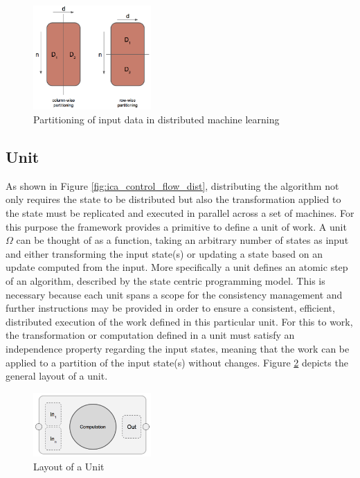 \begin{figure}[ht]
\centering
\includegraphics[width=0.4\textwidth]{img/row_col_dist.png}
\caption{Partitioning of input data in distributed machine learning}
\label{fig:row_col_dist}
\end{figure}

\subsection{Unit}
\label{ss:unit}
As shown in Figure \ref{fig:ica_control_flow_dist}, distributing the algorithm not only requires the state to be distributed but also the transformation applied to the state must be replicated and executed in parallel across a set of machines.
For this purpose the framework provides a primitive to define a unit of work.
A unit $\Omega$ can be thought of as a function, taking an arbitrary number of states as input and either transforming the input state(s) or updating a state based on an update computed from the input.
More specifically a unit defines an atomic step of an algorithm, described by the state centric programming model.
This is necessary because each unit spans a scope for the consistency management and further instructions may be provided in order to ensure a consistent, efficient, distributed execution of the work defined in this particular unit.
For this to work, the transformation or computation defined in a unit must satisfy an independence property regarding the input states, meaning that the work can be applied to a partition of the input state(s) without changes.
Figure \ref{fig:unit} depicts the general layout of a unit.
\begin{figure}[ht]
\centering
\includegraphics[width=0.4\textwidth]{img/unit.png}
\caption{Layout of a Unit}
\label{fig:unit}
\end{figure}
